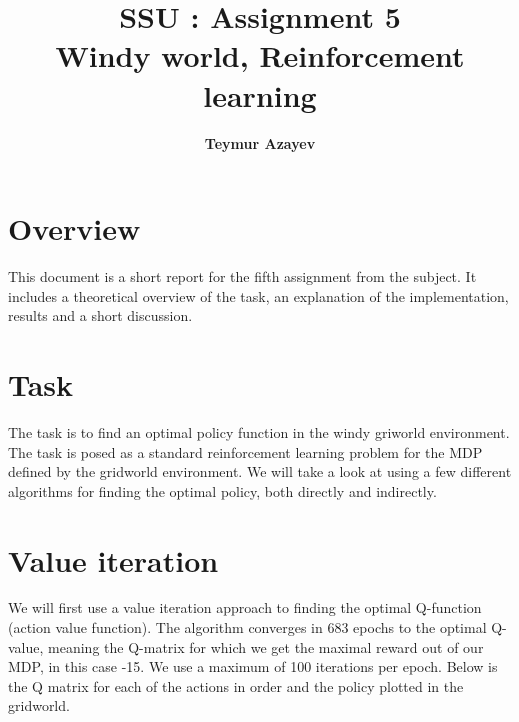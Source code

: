 \documentclass[11pt]{article}
\title{\textbf{SSU : Assignment 5} \\ \textbf{Windy world, Reinforcement learning}}
\author{\textbf{Teymur Azayev}}
\date{}
\begin{document}
\maketitle

\section{Overview}
This document is a short report for the fifth assignment from the subject. It includes a theoretical overview of the task, an explanation of the implementation, results and a short discussion.

\section{Task}
The task is to find an optimal policy function in the windy griworld environment. The task
is posed as a standard reinforcement learning problem for the MDP defined by the gridworld environment.
We will take a look at using a few different algorithms for finding the optimal policy, both directly and indirectly. 


\section{Value iteration}
We will first use a value iteration approach to finding the optimal Q-function (action value function). 
The algorithm converges in 683 epochs to the optimal Q-value, meaning the Q-matrix for which we get the maximal reward out of our MDP, in this case -15. We use a maximum of 100 iterations per epoch. Below is the Q matrix for each of the actions in order and the policy plotted in the gridworld.
\end{document}
